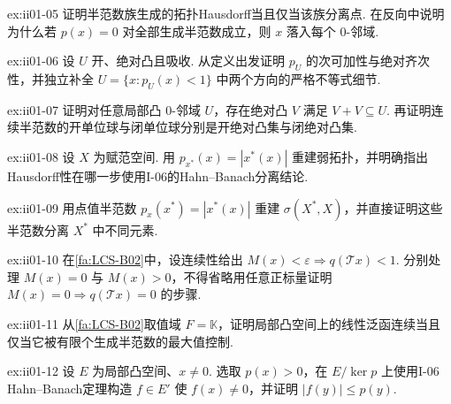 \begin{FAExercise}[Hausdorff判据]{ex:ii01-05}
证明半范数族生成的拓扑Hausdorff当且仅当该族分离点. 在反向中说明为什么若 \(\displaystyle p(x)=0\) 对全部生成半范数成立，则 \(\displaystyle x\) 落入每个 \(\displaystyle0\)-邻域.
\end{FAExercise}

\begin{FAExercise}[Minkowski泛函]{ex:ii01-06}
设 \(\displaystyle U\) 开、绝对凸且吸收. 从定义出发证明 \(\displaystyle p_U\) 的次可加性与绝对齐次性，并独立补全 \(\displaystyle U=\{x:p_U(x)<1\}\) 中两个方向的严格不等式细节.
\end{FAExercise}

\begin{FAExercise}[局部凸邻域工具]{ex:ii01-07}
证明对任意局部凸 \(\displaystyle0\)-邻域 \(\displaystyle U\)，存在绝对凸 \(\displaystyle V\) 满足 \(\displaystyle V+V\subseteq U\). 再证明连续半范数的开单位球与闭单位球分别是开绝对凸集与闭绝对凸集.
\end{FAExercise}

\begin{FAExercise}[弱拓扑是局部凸拓扑]{ex:ii01-08}
设 \(\displaystyle X\) 为赋范空间. 用 \(\displaystyle p_{x^*}(x)=|x^*(x)|\) 重建弱拓扑，并明确指出Hausdorff性在哪一步使用I-06的Hahn--Banach分离结论.
\end{FAExercise}

\begin{FAExercise}[弱*拓扑是局部凸拓扑]{ex:ii01-09}
用点值半范数 \(\displaystyle p_x(x^*)=|x^*(x)|\) 重建 \(\displaystyle \sigma(X^*,X)\)，并直接证明这些半范数分离 \(\displaystyle X^*\) 中不同元素.
\end{FAExercise}

\begin{FAExercise}[半范数连续线性映射判据必要性中的零情形]{ex:ii01-10}
在\autoref{fa:LCS-B02}中，设连续性给出 \(\displaystyle M(x)<\varepsilon\Rightarrow q(\mathcal Tx)<1\). 分别处理 \(\displaystyle M(x)=0\) 与 \(\displaystyle M(x)>0\)，不得省略用任意正标量证明 \(\displaystyle M(x)=0\Rightarrow q(\mathcal Tx)=0\) 的步骤.
\end{FAExercise}

\begin{FAExercise}[连续泛函判据]{ex:ii01-11}
从\autoref{fa:LCS-B02}取值域 \(\displaystyle F=\mathbb K\)，证明局部凸空间上的线性泛函连续当且仅当它被有限个生成半范数的最大值控制.
\end{FAExercise}

\begin{FAExercise}[连续对偶分离点]{ex:ii01-12}
设 \(\displaystyle E\) 为局部凸空间、\(\displaystyle x\neq0\). 选取 \(\displaystyle p(x)>0\)，在 \(\displaystyle E/\ker p\) 上使用I-06 Hahn--Banach定理构造 \(\displaystyle f\in E'\) 使 \(\displaystyle f(x)\neq0\)，并证明 \(\displaystyle |f(y)|\leqslant p(y)\).
\end{FAExercise}

